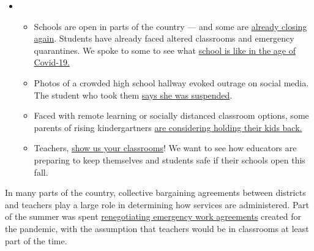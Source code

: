 \begin{itemize}
\item
  \begin{itemize}
  \tightlist
  \item
    Schools are open in parts of the country --- and some are
    \href{https://www.nytimes3xbfgragh.onion/2020/08/03/us/school-closing-coronavirus.html?action=click\&pgtype=Article\&state=default\&region=MAIN_CONTENT_2\&context=storylines_keepup}{already
    closing again}. Students have already faced altered classrooms and
    emergency quarantines. We spoke to some to see what
    \href{https://www.nytimes3xbfgragh.onion/2020/08/06/us/coronavirus-students.html?action=click\&pgtype=Article\&state=default\&region=MAIN_CONTENT_2\&context=storylines_keepup}{school
    is like in the age of Covid-19.}
  \item
    Photos of a crowded high school hallway evoked outrage on social
    media. The student who took them
    \href{https://www.nytimes3xbfgragh.onion/2020/08/06/us/north-paulding-high-school-coronavirus-georgia.html?action=click\&pgtype=Article\&state=default\&region=MAIN_CONTENT_2\&context=storylines_keepup}{says
    she was suspended}.
  \item
    Faced with remote learning or socially distanced classroom options,
    some parents of rising kindergartners
    \href{https://www.nytimes3xbfgragh.onion/2020/07/23/parenting/school-opening-kindergarten-coronavirus.html?action=click\&pgtype=Article\&state=default\&region=MAIN_CONTENT_2\&context=storylines_keepup}{are
    considering holding their kids back.}
  \item
    Teachers,
    \href{https://www.nytimes3xbfgragh.onion/2020/08/05/reader-center/teachers-show-us-how-the-coronavirus-is-changing-your-classroom.html?action=click\&pgtype=Article\&state=default\&region=MAIN_CONTENT_2\&context=storylines_keepup}{show
    us your classrooms}! We want to see how educators are preparing to
    keep themselves and students safe if their schools open this fall.
  \end{itemize}
\end{itemize}

In many parts of the country, collective bargaining agreements between
districts and teachers play a large role in determining how services are
administered. Part of the summer was spent
\href{https://www.nytimes3xbfgragh.onion/2020/07/29/us/teacher-union-school-reopening-coronavirus.html}{renegotiating
emergency work agreements} created for the pandemic, with the assumption
that teachers would be in classrooms at least part of the time.

